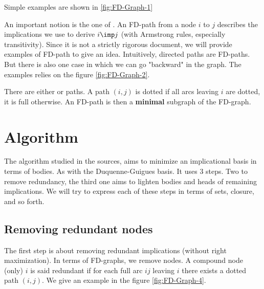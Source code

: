 \noindent Simple examples are shown in \ref{fig:FD-Graph-1}

\begin{center}
	
\end{center}

\noindent An important notion is the one of . An FD-path 
from a node $i$ to $j$ describes the implications we use to derive $i \imp j$
(with Armstrong rules, especially transitivity). Since it is not a strictly
rigorous document, we will provide examples of FD-path to give an idea. 
Intuitively, directed paths are FD-paths. But there is also one case in which
we can go "backward" in the graph. The examples relies on the figure
\ref{fig:FD-Graph-2}.

\newpage

\begin{center}
	
\end{center}

There are either  or  paths. A path $(i, j)$ is 
dotted if all arcs leaving $i$ are dotted, it is full otherwise. An FD-path is
then a \textbf{minimal} subgraph of the FD-graph.

\begin{center}
	
\end{center}

\newpage

\section{Algorithm}

The algorithm studied in the sources, aims to minimize an implicational basis 
in terms of bodies. As with the Duquenne-Guigues basis. It uses 3 steps. Two
to remove redundancy, the third one aims to lighten bodies and heads of 
remaining implications. We will try to express each of these steps in terms of
sets, closure, and so forth. 

\subsection{Removing redundant nodes}

The first step is about removing redundant implications (without right
maximization). In terms of FD-graphs, we remove  nodes. A
compound node (only) $i$ is said redundant if for each full arc $ij$ leaving $i$
there exists a dotted path $(i, j)$. We give an example in the figure
\ref{fig:FD-Graph-4}.

